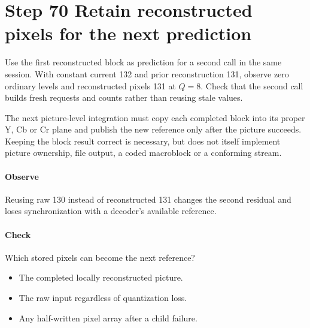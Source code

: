 \section{Step 70 Retain reconstructed pixels for the next prediction}\label{h263-block-s10}
Use the first reconstructed block as prediction for a second call in the same
session. With constant current 132 and prior reconstruction 131, observe zero
ordinary levels and reconstructed pixels 131 at $Q=8$. Check that the second
call builds fresh requests and counts rather than reusing stale values.

The next picture-level integration must copy each completed block into its proper
Y, Cb or Cr plane and publish the new reference only after the picture succeeds.
Keeping the block result correct is necessary, but does not itself implement
picture ownership, file output, a coded macroblock or a conforming stream.

\paragraph{Observe} Reusing raw 130 instead of reconstructed 131 changes the
second residual and loses synchronization with a decoder's available reference.
\paragraph{Check} Which stored pixels can become the next reference?
\begin{itemize}
  \item[A.] The completed locally reconstructed picture.
  \item[B.] The raw input regardless of quantization loss.
  \item[C.] Any half-written pixel array after a child failure.
\end{itemize}
